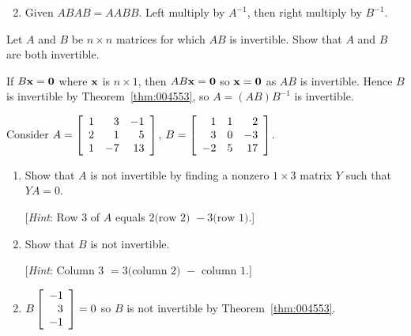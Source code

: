 \begin{multicols}{2}
\begin{ex}
\begin{enumerate}[label={\alph*.}]
\end{enumerate}
\begin{sol}
\begin{enumerate}[label={\alph*.}]
\setcounter{enumi}{1}
\item  Given $ABAB = AABB$. Left multiply by $A^{-1}$, then right multiply by $B^{-1}$.

\end{enumerate}
\end{sol}
\end{ex}

\begin{ex}
Let $A$ and $B$ be $n \times n$ matrices for which $AB$ is invertible. Show that $A$ and $B$ are both invertible.

\begin{sol}
If $B\textbf{x} = \textbf{0}$ where $\textbf{x}$ is $n \times 1$, then $AB\textbf{x} = \textbf{0}$ so $\textbf{x} = \textbf{0}$ as $AB$ is invertible. Hence $B$ is invertible by Theorem~\ref{thm:004553}, so $A = (AB)B^{-1}$ is invertible.
\end{sol}
\end{ex}

\begin{ex}
Consider $A = \left[ \begin{array}{rrr}
1 & 3 & -1 \\
2 & 1 & 5 \\
1 & -7 & 13
\end{array} \right]$, \newline $B = \left[ \begin{array}{rrr}
1 & 1 & 2 \\
3 & 0 & -3 \\
-2 & 5 & 17
\end{array} \right]$.



\begin{enumerate}[label={\alph*.}]
\item Show that $A$ is not invertible by finding a nonzero $1 \times 3$ matrix $Y$ such that $YA = 0$.


[\textit{Hint}: Row 3 of $A$ equals $2\mbox{(row 2) }- 3\mbox{(row 1)}$.]

\item Show that $B$ is not invertible.


[\textit{Hint}: Column 3 $= 3\mbox{(column 2) } - \mbox{ column 1}$.]

\end{enumerate}
\begin{sol}
\begin{enumerate}[label={\alph*.}]
\setcounter{enumi}{1}
\item $B \left[ \begin{array}{r}
-1 \\
3 \\
-1
\end{array} \right] = 0$
 so $B$ is not invertible by Theorem~\ref{thm:004553}.


\end{enumerate}
\end{sol}
\end{ex}
\end{multicols}

